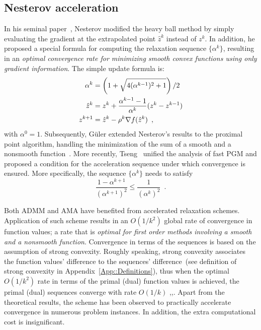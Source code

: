 \documentclass[openany]{now}
\begin{document}
\subsection{Nesterov acceleration}
In his seminal paper~\cite{nest83}, Nesterov modified the heavy ball method by simply evaluating the gradient at the extrapolated point $\hat{z}^k$ instead of $z^k$. In addition, he proposed a special formula for computing the relaxation sequence $\{\alpha^k\}$, resulting in an \emph{optimal convergence rate for minimizing smooth convex functions using only gradient information}. The simple update formula is:
\begin{align}{\label{eq:Nest}}
\alpha^{k} \nonumber &= \left(1+\sqrt{4(\alpha^{k-1})^{2}+1}\right)/2\\
\hat{z}^{k} &= z^k + \frac{\alpha^{k-1}-1}{\alpha^{k}}(z^k-z^{k-1})\\
z^{k+1} \nonumber &= \hat{z}^{k} - \rho^k\nabla f(\hat{z}^{k})\enspace,
\end{align}
with $\alpha^0=1$.
Subsequently, G\"{u}ler extended Nesterov's results to the proximal point algorithm, handling the minimization of the sum of a smooth and a nonsmooth function~\cite{Guer:1992}. More recently, Tseng~\cite{tseng2008accelerated} unified the analysis of fast PGM and proposed a condition for the acceleration sequence under which convergence is ensured. More specifically, the sequence $\{\alpha^{k}\}$ needs to satisfy
\begin{equation*}
 \frac{1-\alpha^{k+1}}{(\alpha^{k+1})^2} \le \frac{1}{(\alpha^k)^2}\enspace.
\end{equation*}

Both ADMM and AMA have benefited from accelerated relaxation schemes. Application of such scheme results in an $O(1/k^2)$ global rate of convergence in function values; a rate that is \emph{optimal for first order methods involving a smooth and a nonsmooth function}. Convergence in terms of the sequences is based on the assumption of strong convexity. Roughly speaking, strong convexity associates the function values' difference to the sequences' difference~(see definition of strong convexity in Appendix~\ref{App::Definitions}), thus when the optimal $O(1/k^2)$ rate in terms of the primal (dual) function values is achieved, the primal (dual) sequences converge with rate $O(1/k)$ \cite{goldstein2014fast},\cite{beck2014fast},\cite{chamb}. Apart from the theoretical results, the scheme has been observed to practically accelerate convergence in numerous problem instances. In addition, the extra computational cost is insignificant. 
\end{document}
